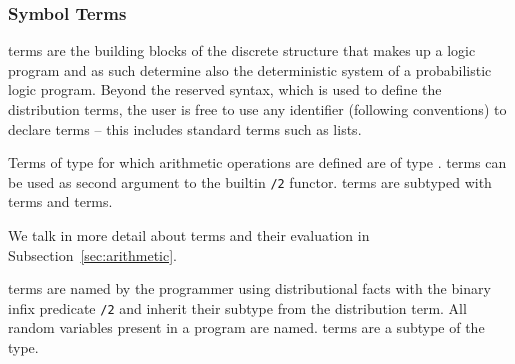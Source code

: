 \subsubsection{Symbol Terms}
 terms are the building blocks of the discrete structure that makes up a logic program and as such determine also the deterministic system of a probabilistic logic program. Beyond the reserved syntax, which is used to define the distribution terms, the user is free to use any identifier (following \prologsty conventions) to declare  terms -- this includes standard \prologsty terms such as lists.

\begin{definition}
	Terms of type  for which arithmetic operations are defined are of type .  terms can be used as second argument to the builtin \lstinline[columns=fixed]|/2| functor.  terms are subtyped with  terms and  terms.
\end{definition}
We talk in more detail about  terms and their evaluation in Subsection~\ref{sec:arithmetic}.

\begin{definition} \label{def:random_variable}
	 terms are named by the programmer using distributional facts with the binary infix predicate \lstinline[columns=fixed]|/2| and inherit their subtype from the distribution term. All random variables present in a \dcproblogsty program are named.  terms are a subtype of the  type. 
\end{definition}

